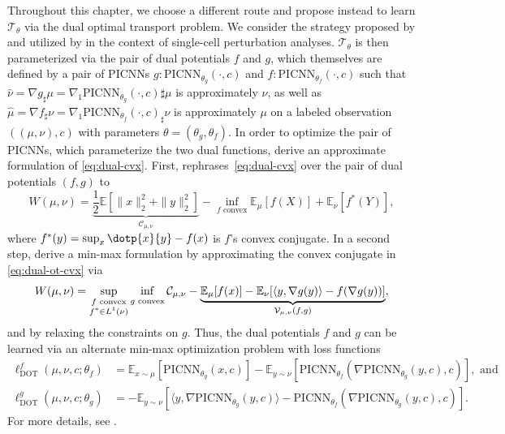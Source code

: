 Throughout this chapter, we choose a different route and propose instead to learn $\mathcal{T}_{\theta}$ via the dual optimal transport problem. We consider the strategy proposed by \citet{makkuva2020optimal} and utilized by \citet{bunne2021learning} in the context of single-cell perturbation analyses.
 $\mathcal{T}_{\theta}$ is then parameterized via the pair of dual potentials $f$ and $g$, which  themselves are defined by a pair of PICNNs $g:\text{PICNN}_{\theta_g}(\cdot,c)$ and $f:\text{PICNN}_{\theta_f}(\cdot,c)$ such that $\hat{\nu} = \nabla g _\sharp \mu = \nabla_1 \text{PICNN}_{\theta_g} (\cdot,c)\sharp \mu$ is approximately $\nu$, as well as $\hat{\mu} = \nabla f _\sharp \nu = \nabla_1 \text{PICNN}_{\theta_f} (\cdot, c)_\sharp\nu$ is approximately $\mu$ on a labeled observation $((\mu,\nu),c)$ with parameters $\theta = (\theta_g, \theta_f)$.
In order to optimize the pair of PICNNs, which parameterize the two dual functions, \citet{makkuva2020optimal} derive an approximate formulation of \eqref{eq:dual-cvx}.
First, \citet[Theorem 2.9]{villani2021topics} rephrases~\eqref{eq:dual-cvx} over the pair of dual potentials $(f, g)$ to
\begin{equation} \label{eq:dual-ot-cvx}
    W(\mu, \nu)= \underbrace{\frac{1}{2}\mathbb{E}\left[\|x\|_{2}^{2}+\|y\|_{2}^{2}\right]}_{\mathcal{C}_{\mu, \nu}}-\inf _{f \text{ convex}} \mathbb{E}_{\mu}[f(X)]+\mathbb{E}_{\nu}\left[f^{*}(Y)\right],
\end{equation}
where $f^*(y) = \sup_x \dotp{x}{y} - f(x)$ is $f$'s convex conjugate.
In a second step, \citet{makkuva2020optimal} derive a min-max formulation by approximating the convex conjugate in \eqref{eq:dual-ot-cvx} via
\begin{equation} \label{eq:ot-minmax}
    W(\mu, \nu)=\sup _{\substack{f  \text{ convex} \\ f^{*} \in L^{1}(\nu)}} \newinf _{g \text{ convex}}  \mathcal{C}_{\mu, \nu} - \underbrace{\mathbb{E}_{\mu}[f(x)]-\mathbb{E}_{\nu}[\langle y, \nabla g(y)\rangle-f(\nabla g(y))]}_{\mathcal{V}_{\mu, \nu}(f, g)},
\end{equation}
and by relaxing the constraints on $g$. 
Thus, the dual potentials $f$ and $g$ can be learned via an alternate min-max optimization problem with loss functions
\begin{align} 
    \ell_\text{DOT}^f(\mu, \nu, c; \theta_f) &= \mathbb{E}_{x \sim \mu}[\text{PICNN}_{\theta_g}(x, c)] - \mathbb{E}_{y \sim \nu}[\text{PICNN}_{\theta_f}(\nabla \text{PICNN}_{\theta_g}(y, c), c)], \text{ and }  \label{eq:makkuva_f_loss} \\
    \ell_\text{DOT}^g(\mu, \nu, c; \theta_g) &= -\mathbb{E}_{y \sim \nu}[\langle y, \nabla \text{PICNN}_{\theta_g}(y, c)\rangle-\text{PICNN}_{\theta_f}(\nabla \text{PICNN}_{\theta_g}(y, c), c)]. \label{eq:makkuva_g_loss}
\end{align}
For more details, see \citet{makkuva2020optimal, korotin2021neural}.


